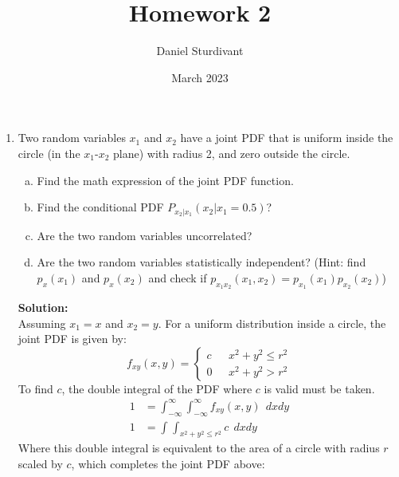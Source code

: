\documentclass[11pt]{article}
\author{Daniel Sturdivant}
\title{Homework 2}
\date{March 2023}
\newcommand{\solution}{\textbf{Solution: \\}}
\begin{document}
\maketitle
\thispagestyle{fancy}
\setlength{\parindent}{0pt}

\begin{enumerate}[label=\textbf{\arabic*.}]
  \itemsep 24pt
  
  \item Two random variables $x_1$ and $x_2$ have a joint PDF that is 
  uniform inside the circle (in the $x_1$-$x_2$ plane) with radius 2, and 
  zero outside the circle.
  \begin{enumerate}[(a)]
    \itemsep -2pt
    \item Find the math expression of the joint PDF function.
    \item Find the conditional PDF $P_{x_2|x_1}(x_2|x_1=0.5)$? 
    \item Are the two random variables uncorrelated?
    \item Are the two random variables statistically independent? (Hint: find 
    $p_x(x_1)$ and $p_x(x_2)$ and check if $p_{x_1x_2}(x_1,x_2)=p_{x_1}(x_1)
    p_{x_2}(x_2)$)
  \end{enumerate}
  \solution
  Assuming $x_1 = x$ and $x_2 = y$. For a uniform distribution inside a 
  circle, the joint PDF is given by:
  \begin{equation*}
    f_{xy}(x,y) = 
    \begin{cases}
      c & \mbox{ } x^2+y^2 \le r^2 \\
      0 & \mbox{ } x^2+y^2 > r^2
    \end{cases}
  \end{equation*}
  To find $c$, the double integral of the PDF where $c$ is valid must be taken.
  \begin{equation*}
    \begin{split}
      1 &= \int_{-\infty}^{\infty} \int_{-\infty}^{\infty} f_{xy}(x,y)\:\:dxdy \\
      1 &= \int_{}^{} \int_{x^2+y^2 \le r^2}^{} c \:\: dxdy
    \end{split}
  \end{equation*}
  Where this double integral is equivalent to the area of a circle with radius 
  $r$ scaled by $c$, which completes the joint PDF above:
  \begin{equation*}
    \begin{split}

\end{split}
\end{equation*}
\end{enumerate}
\end{document}

